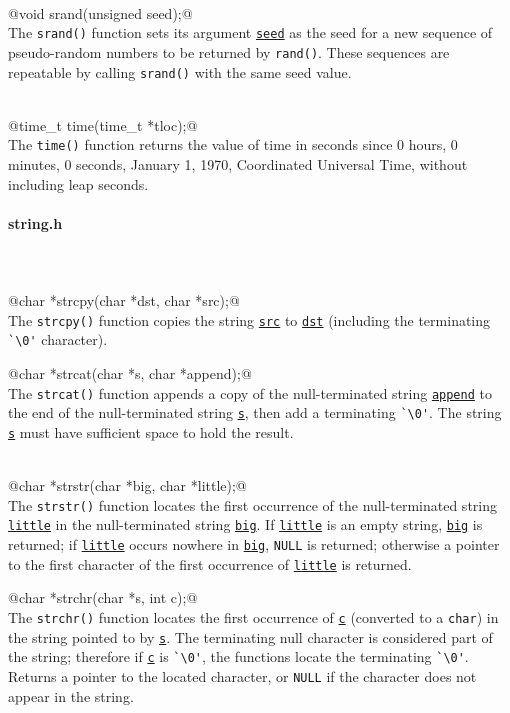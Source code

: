 \documentclass[11pt,twocolumn]{scrartcl}
\newcommand{\ul}[1]{\underline{\texttt{#1}}}
\begin{document}
\hfill\\
@void srand(unsigned seed);@\\
The \verb|srand()| function sets its argument \ul{seed} as the seed for a new
sequence of pseudo-random numbers to be returned by \verb|rand()|.  These
sequences are repeatable by calling \verb|srand()| with the same seed value.

\hfill\\
@time_t time(time_t *tloc);@\\
The \verb|time()| function returns the value of time in seconds since 0 hours, 0 minutes,
0 seconds, January 1, 1970, Coordinated Universal Time, without including leap seconds.

\newpage
\paragraph{string.h}\hfill\\
\hfill\\
@char *strcpy(char *dst, char *src);@\\
The \verb|strcpy()| function copies the string \ul{src} to \ul{dst} (including
the terminating \verb|`\0'| character).

@char *strcat(char *s, char *append);@\\
The \verb|strcat()| function appends a copy of the null-terminated
string \ul{append} to the end of the null-terminated string \ul{s}, then add a
terminating \verb|`\0'|.  The string \ul{s} must have sufficient space to hold the
result.

\hfill\\
@char *strstr(char *big, char *little);@\\
The \verb|strstr()| function locates the first occurrence of the null-terminated
string \ul{little} in the null-terminated string \ul{big}.
If \ul{little} is an empty string, \ul{big} is returned; if \ul{little} occurs nowhere
in \ul{big}, \verb|NULL| is returned; otherwise a pointer to the first character of
the first occurrence of \ul{little} is returned.

@char *strchr(char *s, int c);@\\
The \verb|strchr()| function locates the first occurrence of \ul{c} (converted to a
\verb|char|) in the string pointed to by \ul{s}.  The terminating null character is
considered part of the string; therefore if \ul{c} is \verb|`\0'|, the functions
locate the terminating \verb|`\0'|.
Returns a pointer to the located character, or \verb|NULL| if the character does not
appear in the string.
\end{document}
